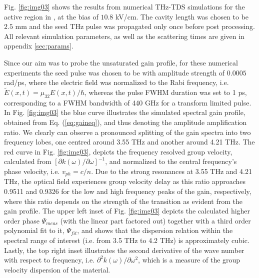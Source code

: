\documentclass[twocolumn,secnumarabic,amssymb, nobibnotes, aps, prd]{revtex4-1}
\def\p{\partial}
\begin{document}
{			Fig. \ref{fig:img03} shows the results from numerical THz-TDS simulations for the active region in \cite{burghoff2014terahertz}, at the bias of $10.8$ kV/cm. The cavity length was chosen to be $2.5$ mm and the seed THz pulse was propagated only once before post processing. All relevant simulation parameters, as well as the scattering times are given in appendix \ref{sec:params}. 
			
			Since our aim was to probe the unsaturated gain profile, for these numerical experiments the seed pulse was chosen to be with amplitude strength of $0.0005$ rad/ps, where the electric field was normalized to the Rabi frequency, i.e. $\tilde{E}(x,t) = \mu_{32} E(x,t)/\hbar$, whereas the pulse FWHM duration was set to 1 ps, corresponding to a FWHM bandwidth of 440 GHz for a transform limited pulse. 
			In Fig. \ref{fig:img03} the blue curve illustrates the simulated spectral gain profile, obtained from Eq. (\ref{eq:gaineq}), and thus denoting the  amplitude amplification ratio. We clearly can observe a pronounced splitting of the gain spectra into two frequency lobes, one centred around 3.55 THz and another around 4.21 THz. The red curve in Fig. \ref{fig:img03}, depicts the frequency resolved group velocity, calculated from $[\p k(\omega)/\p \omega]^{-1}$, and normalized to the central frequency's phase velocity, i.e. $v_{ph} = c/n$. Due to the strong resonances at 3.55 THz and 4.21 THz, the optical field experiences group velocity delay as this ratio approaches 0.9511 and 0.9326 for the low and high frequency peaks of the gain, respectively, where this ratio depends on the strength of the transition as evident from the gain profile. The upper left inset of Fig. \ref{fig:img03} depicts the calculated higher order phase $\Psi_{meas}$ (with the linear part factored out) together with a third order polynomial fit to it, $\Psi_{fit}$, and shows that the dispersion relation within the spectral range of interest (i.e. from 3.5 THz to 4.2 THz) is approximately cubic. Lastly, the top right inset illustrates the second derivative of the wave number with respect to frequency, i.e. $\p^2 k(\omega)/\p \omega^2$, which is a measure of the group velocity dispersion of the material.
			
}
\end{document}
